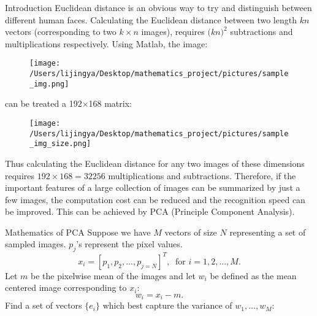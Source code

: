 \documentclass[final]{beamer}
\newlength{\onecolwid}
\begin{document}
\begin{frame}[t]
\begin{columns}[t]
\begin{column}{\onecolwid}
\begin{block}{Introduction}
Euclidean distance is an obvious way to try and distinguish between different human faces. Calculating the Euclidean distance between two length $kn$ vectors (corresponding to two $k \times n$ images), requires $\Big(kn\Big)^2$ subtractions and multiplications respectively. Using Matlab, the image:
\begin{figure}[h]
\centering
\texttt{[image: /Users/lijingya/Desktop/mathematics\_project/pictures/sample\_img.png]}
\end{figure}
can be treated a 192$\times$168 matrix:\\
\begin{figure}[h]
\centering
\texttt{[image: /Users/lijingya/Desktop/mathematics\_project/pictures/sample\_img\_size.png]}
\end{figure}
Thus calculating the Euclidean distance for any two images of these dimensions requires $192\times168=32256$ multiplications and subtractions. Therefore, if the important features of a large collection of images can be summarized by just a few images, the computation cost can be reduced and the recognition speed can be improved. This can be achieved by PCA (Principle Component Analysis).
\end{block}

\vspace{-5mm}


\begin{block}{Mathematics of PCA}
Suppose we have $M$ vectors of size $N$ representing a set of sampled images. $p_j$'s represent the pixel values.
\begin{equation*}
x_i = [p_1,p_2,...,p_{j=N}]^T, \;\; \text{for } i=1,2,...,M.
\end{equation*}
Let $m$ be the pixelwise mean of the images
and let $w_i$ be defined as the mean centered image corresponding to $x_i$:
\begin{equation*}
w_i = x_i - m.
\end{equation*}
Find a set of vectors $\Big\{e_i\Big\}$ which best capture the variance of $w_1, \dots, w_M$:
\end{block}


\end{column}
\end{columns}
\end{frame}
\end{document}
